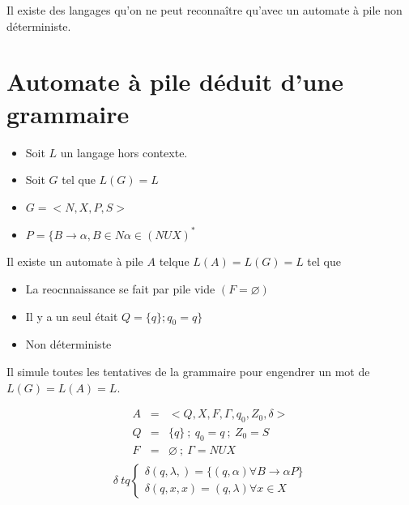 	\begin{remarque}
		Il existe des langages qu'on ne peut reconnaître qu'avec un automate à pile non déterministe.
	\end{remarque}

	\section{Automate à pile déduit d'une grammaire}
	\begin{itemize}
		\item Soit $L$ un langage hors contexte.
		\item Soit $G$ tel que $L(G) = L$
		\item $G= <N,X,P,S>$
		\item $P = \{B\rightarrow \alpha, B\in N \alpha \in(NUX)^*$
	\end{itemize}
	Il existe un automate à pile $A$ telque $L(A) = L(G) = L$ tel que
	\begin{itemize}
		\item La reocnnaissance se fait par pile vide $(F = \varnothing)$
		\item Il y a un seul était $Q=\{q\} ; q_0 = q\}$
		\item Non déterministe
	\end{itemize}

	Il simule toutes les tentatives de la grammaire pour engendrer un mot de $L(G) = L(A) = L$.

	\begin{eqnarray*}
		A &=&   <Q,X,F,\Gamma,q_0,Z_0,\delta>\\
		Q &=&  \{q\}\ ;\ q_0 =  q\ ;\ Z_0 = S\\
	F &=& \varnothing\ ;\ \Gamma = NUX\\
	\end{eqnarray*}
	\begin{displaymath}
		\delta\ tq 
		\left\{ \begin{array}{c}
			\delta(q,\lambda,) = \{(q,\alpha) \forall B \rightarrow \alpha P\}\\
			\delta(q,x,x) = (q,\lambda) \forall x \in X
		\end{array}\right.
	\end{displaymath}
